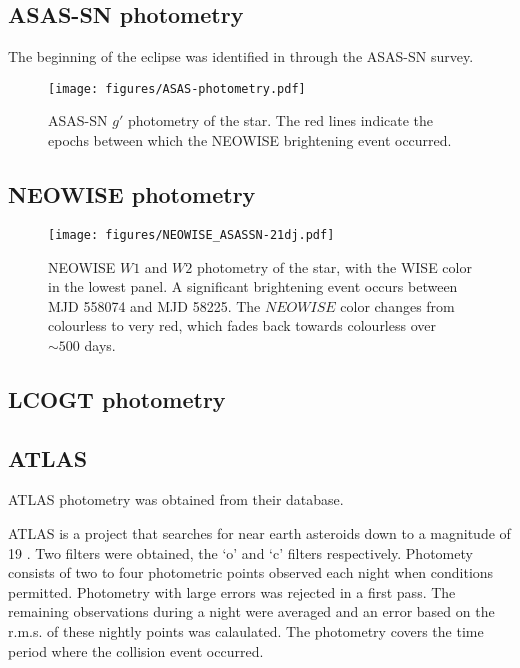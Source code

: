 \documentclass{aa}
\begin{document}
\subsection{ASAS-SN photometry}

The beginning of the eclipse was identified in \citet{RizzoSmith21} through the ASAS-SN survey.
%


\begin{figure}
   \begin{centering}
   \texttt{[image: figures/ASAS-photometry.pdf]}
      \caption{ASAS-SN $g'$ photometry of the star. The red lines indicate the epochs between which the NEOWISE brightening event occurred.
              }
              \label{fig:asphot}
              \end{centering}
       \end{figure}

\subsection{NEOWISE photometry}

\begin{figure}
   \centering
   \texttt{[image: figures/NEOWISE\_ASASSN-21dj.pdf]}
      \caption{NEOWISE $W1$ and $W2$ photometry of the star, with the WISE color in the lowest panel.
      A significant brightening event occurs between MJD 558074 and MJD 58225.
      The $NEOWISE$ color changes from colourless to very red, which fades back towards colourless over $\sim 500$ days.
              }
         \label{fig:wisephot}
   \end{figure}

\subsection{LCOGT photometry}

\subsection{ATLAS}

ATLAS photometry was obtained from their database.



ATLAS is a project that searches for near earth asteroids down to a magnitude of 19 
\citep{Tonry18}.
%
Two filters were obtained, the `o' and `c' filters respectively.
%
Photomety consists of two to four photometric points observed each night when conditions permitted.
%
Photometry with large errors was rejected in a first pass.
%
The remaining observations during a night were averaged and an error based on the r.m.s. of these nightly points was calaulated.
%
The photometry covers the time period where the collision event occurred. 
\end{document}
